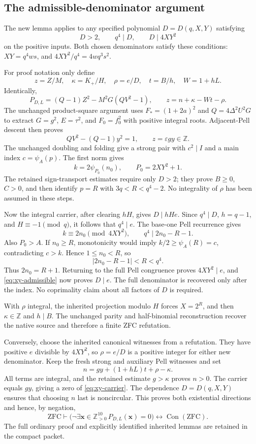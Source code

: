 \subsection{The admissible-denominator argument}

The new lemma applies to any specified polynomial $D=D(q,X,Y)$ satisfying
\begin{equation}
 D>2,\qquad q^4\mid D,\qquad D\mid4XY^2
 \label{eq:xy-admissible}
\end{equation}
on the positive inputs. Both chosen denominators satisfy these conditions:
$XY=q^4ws$, and $4XY^2/q^4=4wq^3s^2$.

For proof notation only define
\[
 z=Z/M,\quad \kappa=K_+/H,\quad\rho=e/D,\quad
 t=B/h,\quad W=1+hL.
\]
Identically,
\[
 P_{D,L}=(Q-1)Z^2-M^2G(QV^2-1),\qquad
 z=n+\kappa-Wt-\rho.
\]
The unchanged product-square argument uses
$F_*=(1+2a)^2$ and $Q=4\Delta^2U^2G$ to extract
$G=g^2$, $E=\tau^2$, and $F_0=f_0^2$ with positive integral roots.
Adjacent-Pell descent then proves
\[
 QV^2-(Q-1)y^2=1,\qquad z=\varepsilon gy\in\mathbb Z.
\]
The unchanged doubling and folding give a strong pair with $c^2\mid I$
and a main index $c=\psi_A(p)$. The first norm gives
\[
 k=2\psi_{P_0}(n_0),\qquad P_0=2XY^2+1.
\]
The retained sign-transport estimates require only $D>2$; they prove
$B\ge0$, $C>0$, and then identify $p=R$ with $3q<R<q^4-2$.
No integrality of $\rho$ has been assumed in these steps.

Now the integral carrier, after clearing $hH$, gives $D\mid hHe$.
Since $q^4\mid D$, $h=q-1$, and $H\equiv-1\pmod q$, it follows that
$q^4\mid e$. The base-one Pell recurrence gives
\[
 k\equiv2n_0\pmod{4XY^2},
 \qquad q^4\mid 2n_0-R-1.
\]
Also $P_0>A$. If $n_0\ge R$, monotonicity would imply
$k/2\ge\psi_A(R)=c$, contradicting $c>k$. Hence $1\le n_0<R$, so
\[
 |2n_0-R-1|<R<q^4.
\]
Thus $2n_0=R+1$. Returning to the full Pell congruence proves
$4XY^2\mid e$, and \eqref{eq:xy-admissible} now proves $D\mid e$.
The full denominator is recovered only after the index. No coprimality
claim about all factors of $D$ is required.

With $\rho$ integral, the inherited projection modulo $H$ forces
$X=2^R$, and then $\kappa\in\mathbb Z$ and $h\mid B$. The unchanged
parity and half-binomial reconstruction recover the native source and
therefore a finite ZFC refutation.

Conversely, choose the inherited canonical witnesses from a refutation.
They have positive $e$ divisible by $4XY^2$, so $\rho=e/D$ is a positive
integer for either new denominator. Keep the fresh strong and auxiliary
Pell witnesses and set
\[
 n=gy+(1+hL)t+\rho-\kappa.
\]
All terms are integral, and the retained estimate $g>\kappa$ proves $n>0$.
The carrier equals $gy$, giving a zero of \eqref{eq:xy-carrier}. The
dependence $D=D(q,X,Y)$ ensures that choosing $n$ last is noncircular.
This proves both existential directions and hence, by negation,
\[
 \mathrm{ZFC}\vdash
 \bigl(\neg\exists\mathbf x\in\mathbb Z_{>0}^{10}\,
 P_{D,L}(\mathbf x)=0\bigr)
 \longleftrightarrow\operatorname{Con}(\mathrm{ZFC}).
\]
The full ordinary proof and explicitly identified inherited lemmas are
retained in the compact packet.

